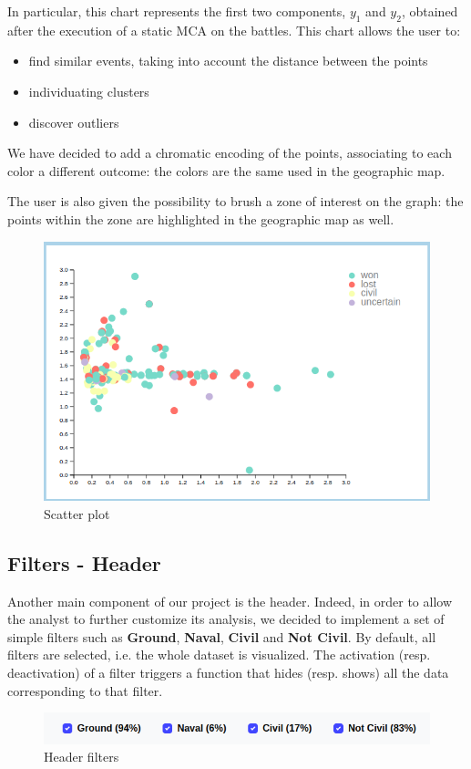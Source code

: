In particular, this chart represents the first two components, $y_1$ and $y_2$, obtained after the execution of a static MCA on the battles. This chart allows the user to:
\begin{itemize}
    \item find similar events, taking into account the distance between the points
    \item individuating clusters
    \item discover outliers
\end{itemize}

We have decided to add a chromatic encoding of the points, associating to each color a different outcome: the colors are the same used in the geographic map.

The user is also given the possibility to brush a zone of interest on the graph: the points within the zone are highlighted in the geographic map as well.
\begin{figure}[h]
\centering
\includegraphics[scale=0.30]{./images/scatter_plot.png}
\caption{Scatter plot}
\end{figure}

\subsection{Filters - Header}
Another main component of our project is the header. Indeed, in order to allow the analyst to further customize its analysis, we decided to implement a set of simple filters such as \textbf{Ground}, \textbf{Naval}, \textbf{Civil} and \textbf{Not Civil}. By default, all filters are selected, i.e. the whole dataset is visualized. The activation (resp. deactivation) of a filter triggers a function that hides (resp. shows) all the data corresponding to that filter.
\begin{figure}[h]
\centering
\includegraphics[scale=0.32]{./images/header_filters.png}
\caption{Header filters}
\end{figure}

